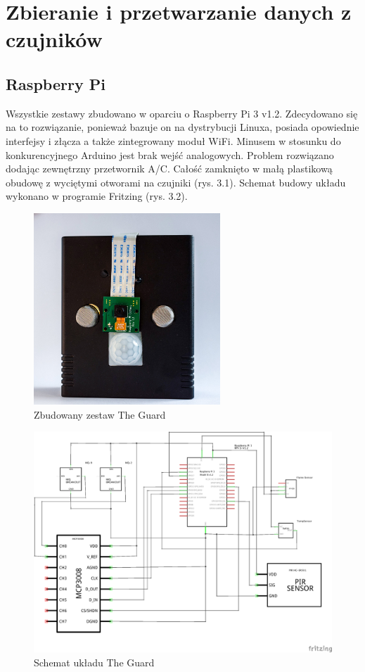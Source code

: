 \chapter{Zbieranie i przetwarzanie danych z czujników}
\section{Raspberry Pi}
Wszystkie zestawy zbudowano w oparciu o Raspberry Pi 3 v1.2. Zdecydowano się na to rozwiązanie, ponieważ bazuje on na dystrybucji Linuxa, posiada opowiednie interfejsy i złącza a także zintegrowany moduł WiFi. Minusem w stosunku do konkurencyjnego Arduino jest brak wejść analogowych. Problem rozwiązano dodając zewnętrzny przetwornik A/C. Całość zamknięto w małą plastikową obudowę z wyciętymi otworami na czujniki (rys. 3.1). Schemat budowy układu wykonano w programie Fritzing (rys. 3.2).
\begin{figure}[h]
	\centering
	\includegraphics[width=7cm]{guard.jpg}
	\caption{Zbudowany zestaw The Guard}
\end{figure}
\begin{figure}[h]
	\centering
	\includegraphics[width=15cm]{GuardSchem}
	\caption{Schemat układu The Guard}
\end{figure}
